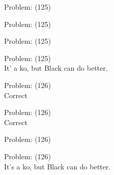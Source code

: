 \documentclass[11pt]{article}
\begin{document}
\begin{minipage}[t]{0.5\textwidth}
  {\centering
  
  Problem: (125)\\
  
  }
\end{minipage}
\begin{minipage}[t]{0.5\textwidth}
  {\centering
  
  Problem: (125)\\
  
  }
\end{minipage}
\begin{minipage}[t]{0.5\textwidth}
  {\centering
  
  Problem: (125)\\
  
  }
\end{minipage}
\begin{minipage}[t]{0.5\textwidth}
  {\centering
  
  Problem: (125)\\
  It' a ko, but Black can do better.\\
  }
\end{minipage}
\begin{minipage}[t]{0.5\textwidth}
  {\centering
  
  Problem: (126)\\
  Correct\\
  }
\end{minipage}
\begin{minipage}[t]{0.5\textwidth}
  {\centering
  
  Problem: (126)\\
  Correct\\
  }
\end{minipage}
\begin{minipage}[t]{0.5\textwidth}
  {\centering
  
  Problem: (126)\\
  
  }
\end{minipage}
\begin{minipage}[t]{0.5\textwidth}
  {\centering
  
  Problem: (126)\\
  It's a ko, but Black can do better.\\
  }
\end{minipage}
\end{document}
